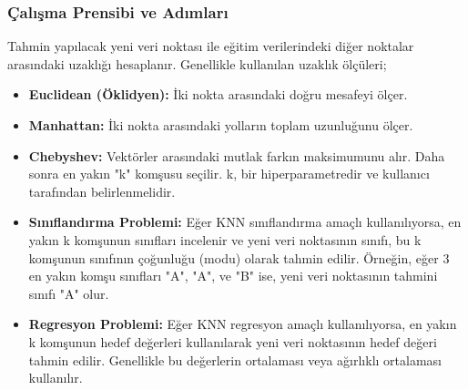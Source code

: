 \subsubsection{Çalışma Prensibi ve Adımları}
Tahmin yapılacak yeni veri noktası ile eğitim verilerindeki diğer noktalar arasındaki uzaklığı hesaplanır. Genellikle kullanılan uzaklık ölçüleri;
\begin{itemize}
\item \textbf{Euclidean (Öklidyen):} İki nokta arasındaki doğru mesafeyi ölçer.
\item \textbf{Manhattan:} İki nokta arasındaki yolların toplam uzunluğunu ölçer.
\item \textbf{Chebyshev:} Vektörler arasındaki mutlak farkın maksimumunu alır. Daha sonra en yakın "k" komşusu seçilir. k, bir hiperparametredir ve kullanıcı tarafından belirlenmelidir.
\item \textbf{Sınıflandırma Problemi:} Eğer KNN sınıflandırma amaçlı kullanılıyorsa, en yakın k komşunun sınıfları incelenir ve yeni veri noktasının sınıfı, bu k komşunun sınıfının çoğunluğu (modu) olarak tahmin edilir. Örneğin, eğer 3 en yakın komşu sınıfları "A", "A", ve "B" ise, yeni veri noktasının tahmini sınıfı "A" olur.
\item \textbf{Regresyon Problemi:} Eğer KNN regresyon amaçlı kullanılıyorsa, en yakın k komşunun hedef değerleri kullanılarak yeni veri noktasının hedef değeri tahmin edilir. Genellikle bu değerlerin ortalaması veya ağırlıklı ortalaması kullanılır.
\end{itemize}

